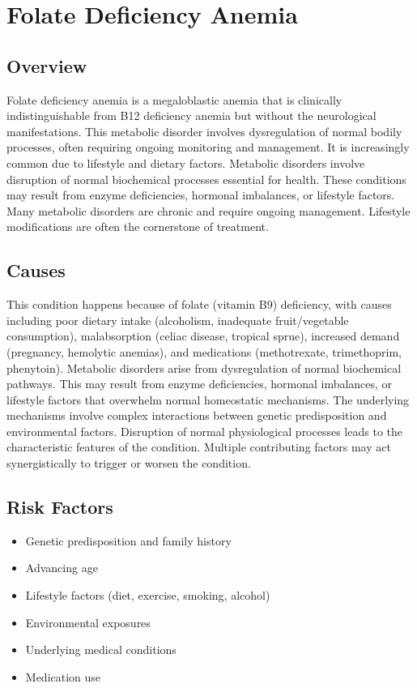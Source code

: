 \chapter{Folate Deficiency Anemia}
\label{sec:Folate Deficiency Anemia}

\section{Overview}
Folate deficiency anemia is a megaloblastic anemia that is clinically indistinguishable from B12 deficiency anemia but without the neurological manifestations. This metabolic disorder involves dysregulation of normal bodily processes, often requiring ongoing monitoring and management. It is increasingly common due to lifestyle and dietary factors. Metabolic disorders involve disruption of normal biochemical processes essential for health. These conditions may result from enzyme deficiencies, hormonal imbalances, or lifestyle factors. Many metabolic disorders are chronic and require ongoing management. Lifestyle modifications are often the cornerstone of treatment.
\section{Causes}
This condition happens because of folate (vitamin B9) deficiency, with causes including poor dietary intake (alcoholism, inadequate fruit/vegetable consumption), malabsorption (celiac disease, tropical sprue), increased demand (pregnancy, hemolytic anemias), and medications (methotrexate, trimethoprim, phenytoin). Metabolic disorders arise from dysregulation of normal biochemical pathways. This may result from enzyme deficiencies, hormonal imbalances, or lifestyle factors that overwhelm normal homeostatic mechanisms. The underlying mechanisms involve complex interactions between genetic predisposition and environmental factors. Disruption of normal physiological processes leads to the characteristic features of the condition. Multiple contributing factors may act synergistically to trigger or worsen the condition.
\section{Risk Factors}
\begin{itemize}[noitemsep]
  \item Genetic predisposition and family history
  \item Advancing age
  \item Lifestyle factors (diet, exercise, smoking, alcohol)
  \item Environmental exposures
  \item Underlying medical conditions
  \item Medication use
\end{itemize}
